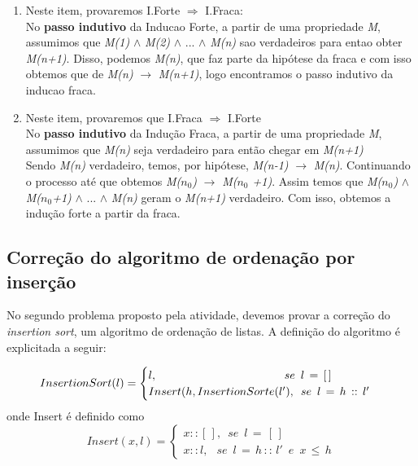 \documentclass[a4paper, 10pt]{article}
\begin{document}
\begin{enumerate}
\item Neste item, provaremos I.Forte $\Rightarrow$ I.Fraca:
	\\No \textbf{passo indutivo} da Inducao Forte, a partir de uma propriedade \textit{M}, assumimos que \textit{M(1)} $\wedge$ \textit{M(2)} $\wedge$ ... $\wedge$ \textit{M(n)} sao verdadeiros para entao obter \textit{M(n+1)}. 
    Disso, podemos  \textit{M(n)}, que faz parte da hipótese da fraca e com isso obtemos que de \textit{M(n)} $\rightarrow$ \textit{M(n+1)}, logo encontramos o passo indutivo da inducao fraca.

\item Neste item, provaremos que I.Fraca $\Rightarrow$ I.Forte 
	\\	No \textbf{passo indutivo} da Indução Fraca, a partir de uma propriedade \textit{M}, assumimos que \textit{M(n)} seja verdadeiro para então chegar em \textit{M(n+1)}
    \\	Sendo \textit{M(n)} verdadeiro, temos, por hipótese, \textit{M(n-1)} $\rightarrow$ \textit{M(n)}. Continuando o processo até que obtemos \textit{M($n_0$)} $\rightarrow$ \textit{M($n_0$ +1)}. Assim temos que \textit{M($n_0$)} $\wedge$ \textit{M($n_0$+1)} $\wedge$ ... $\wedge$ \textit{M(n)} geram o \textit{M(n+1)} verdadeiro.
    Com isso, obtemos a indução forte a partir da fraca.
\end{enumerate}


\subsection{Correção do algoritmo de ordenação por inserção}

No segundo problema proposto pela atividade, devemos provar a correção do \textit{insertion sort}, um algoritmo de ordenação de listas. A definição do algoritmo é explicitada a seguir:

  \begin{equation}
  \label{eq:sort}
      InsertionSort(l) =
      \begin{cases}
          l, \hspace{11.2em}			 	      se \enspace l\,=\,[\,]\\
          Insert(h, InsertionSorte(l'),\enspace se \enspace l\,=\,h\,::\,l'
      \end{cases}
  \end{equation}
  onde Insert é definido como
  \begin{equation}
  \label{eq:insert}
      Insert(x,l) =
      \begin{cases}
          x::[\,],\enspace se\enspace l\,=\,[\,] \\
          x::l,\: \enspace se\enspace l\,=\,h\,::\,l'\enspace e \enspace x\, \leq \, h
      \end{cases}
  \end{equation}
\end{document}
